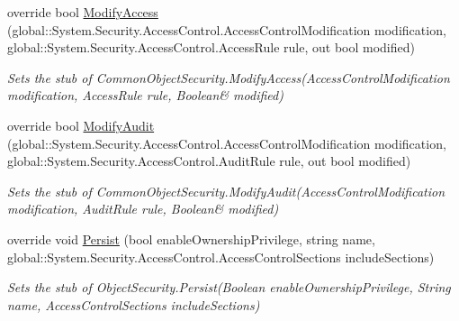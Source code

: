 \begin{DoxyCompactItemize}
override bool \hyperlink{class_system_1_1_security_1_1_access_control_1_1_fakes_1_1_stub_native_object_security_ab9e25aaea13b07559576710ea91d2a98}{Modify\-Access} (global\-::\-System.\-Security.\-Access\-Control.\-Access\-Control\-Modification modification, global\-::\-System.\-Security.\-Access\-Control.\-Access\-Rule rule, out bool modified)
\begin{DoxyCompactList}\small\item\em Sets the stub of Common\-Object\-Security.\-Modify\-Access(Access\-Control\-Modification modification, Access\-Rule rule, Boolean\& modified)\end{DoxyCompactList}\item 
override bool \hyperlink{class_system_1_1_security_1_1_access_control_1_1_fakes_1_1_stub_native_object_security_a1f0b65ed470a06a703660a1db6798fa8}{Modify\-Audit} (global\-::\-System.\-Security.\-Access\-Control.\-Access\-Control\-Modification modification, global\-::\-System.\-Security.\-Access\-Control.\-Audit\-Rule rule, out bool modified)
\begin{DoxyCompactList}\small\item\em Sets the stub of Common\-Object\-Security.\-Modify\-Audit(Access\-Control\-Modification modification, Audit\-Rule rule, Boolean\& modified)\end{DoxyCompactList}\item 
override void \hyperlink{class_system_1_1_security_1_1_access_control_1_1_fakes_1_1_stub_native_object_security_a604806cde1718da2822b9d324c58690b}{Persist} (bool enable\-Ownership\-Privilege, string name, global\-::\-System.\-Security.\-Access\-Control.\-Access\-Control\-Sections include\-Sections)
\begin{DoxyCompactList}\small\item\em Sets the stub of Object\-Security.\-Persist(\-Boolean enable\-Ownership\-Privilege, String name, Access\-Control\-Sections include\-Sections)\end{DoxyCompactList}\end{DoxyCompactItemize}
